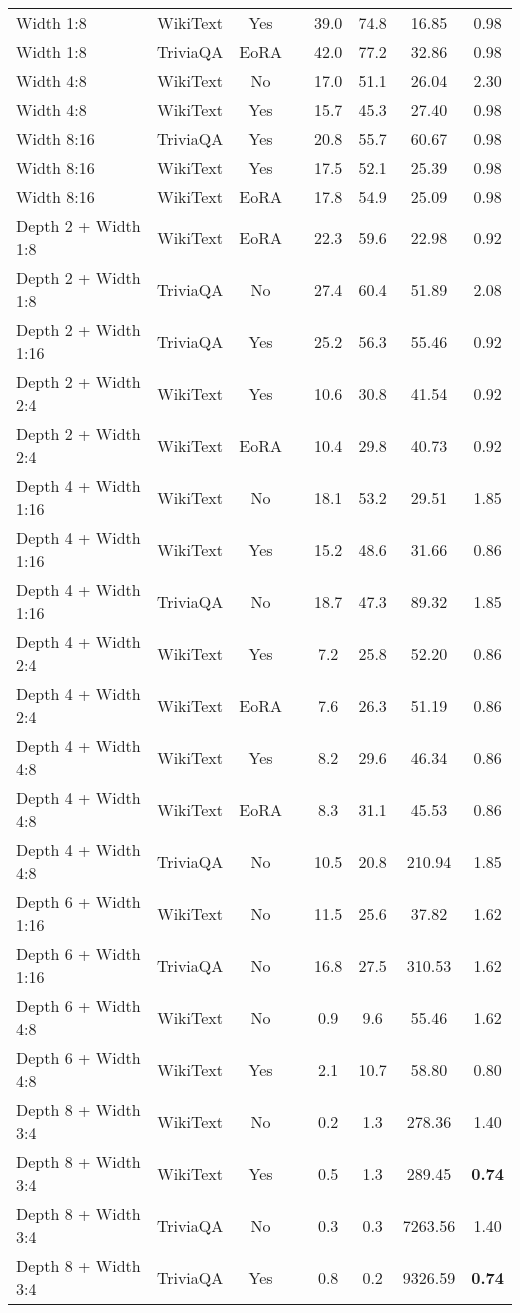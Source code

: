 {\begin{table}[htbp]
\begin{tabular}{lcclcccc}
Width 1:8 & WikiText & Yes & & 39.0 & 74.8 & 16.85 & 0.98 \\
Width 1:8 & TriviaQA & EoRA & & 42.0 & 77.2 & 32.86 & 0.98 \\
Width 4:8 & WikiText & No & & 17.0 & 51.1 & 26.04 & 2.30 \\
Width 4:8 & WikiText & Yes & & 15.7 & 45.3 & 27.40 & 0.98 \\
Width 8:16 & TriviaQA & Yes & & 20.8 & 55.7 & 60.67 & 0.98 \\
Width 8:16 & WikiText & Yes & & 17.5 & 52.1 & 25.39 & 0.98 \\
Width 8:16 & WikiText & EoRA & & 17.8 & 54.9 & 25.09 & 0.98 \\
Depth 2 + Width 1:8 & WikiText & EoRA & & 22.3 & 59.6 & 22.98 & 0.92 \\
Depth 2 + Width 1:8 & TriviaQA & No & & 27.4 & 60.4 & 51.89 & 2.08 \\
Depth 2 + Width 1:16 & TriviaQA & Yes & & 25.2 & 56.3 & 55.46 & 0.92 \\
Depth 2 + Width 2:4 & WikiText & Yes & & 10.6 & 30.8 & 41.54 & 0.92 \\
Depth 2 + Width 2:4 & WikiText & EoRA & & 10.4 & 29.8 & 40.73 & 0.92 \\
Depth 4 + Width 1:16 & WikiText & No & & 18.1 & 53.2 & 29.51 & 1.85 \\
Depth 4 + Width 1:16 & WikiText & Yes & & 15.2 & 48.6 & 31.66 & 0.86 \\
Depth 4 + Width 1:16 & TriviaQA & No & & 18.7 & 47.3 & 89.32 & 1.85 \\
Depth 4 + Width 2:4 & WikiText & Yes & & 7.2 & 25.8 & 52.20 & 0.86 \\
Depth 4 + Width 2:4 & WikiText & EoRA & & 7.6 & 26.3 & 51.19 & 0.86 \\
Depth 4 + Width 4:8 & WikiText & Yes & & 8.2 & 29.6 & 46.34 & 0.86 \\
Depth 4 + Width 4:8 & WikiText & EoRA & & 8.3 & 31.1 & 45.53 & 0.86 \\
Depth 4 + Width 4:8 & TriviaQA & No & & 10.5 & 20.8 & 210.94 & 1.85 \\
Depth 6 + Width 1:16 & WikiText & No & & 11.5 & 25.6 & 37.82 & 1.62 \\
Depth 6 + Width 1:16 & TriviaQA & No & & 16.8 & 27.5 & 310.53 & 1.62 \\
Depth 6 + Width 4:8 & WikiText & No & & 0.9 & 9.6 & 55.46 & 1.62 \\
Depth 6 + Width 4:8 & WikiText & Yes & & 2.1 & 10.7 & 58.80 & 0.80 \\
Depth 8 + Width 3:4 & WikiText & No & & 0.2 & 1.3 & 278.36 & 1.40 \\
Depth 8 + Width 3:4 & WikiText & Yes & & 0.5 & 1.3 & 289.45 & \textbf{0.74} \\
Depth 8 + Width 3:4 & TriviaQA & No & & 0.3 & 0.3 & 7263.56 & 1.40 \\
Depth 8 + Width 3:4 & TriviaQA & Yes & & 0.8 & 0.2 & 9326.59 & \textbf{0.74} \\
\hline
\end{tabular}
\end{table}
}

